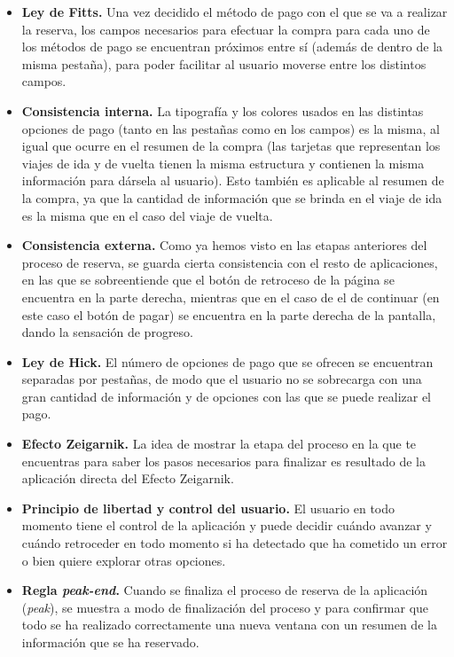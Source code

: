 \begin{itemize}
    \item \textbf{Ley de Fitts.} Una vez decidido el método de pago con el que se va a realizar la reserva, los campos
        necesarios para efectuar la compra para cada uno de los métodos de pago se encuentran próximos entre sí
        (además de dentro de la misma pestaña), para poder facilitar al usuario moverse entre los distintos campos.
    \item \textbf{Consistencia interna.} La tipografía y los colores usados en las distintas opciones de pago (tanto en las
        pestañas como en los campos) es la misma, al igual que ocurre en el resumen de la compra (las tarjetas que
        representan los viajes de ida y de vuelta tienen la misma estructura y contienen la misma información para
        dársela al usuario). Esto también es aplicable al resumen de la compra, ya que la cantidad de información
        que se brinda en el viaje de ida es la misma que en el caso del viaje de vuelta.
    \item \textbf{Consistencia externa.} Como ya hemos visto en las etapas anteriores del proceso de reserva, se
        guarda cierta consistencia con el resto de aplicaciones, en las que se sobreentiende que el botón de retroceso
        de la página se encuentra en la parte derecha, mientras que en el caso de el de continuar (en este caso el
        botón de pagar) se encuentra en la parte derecha de la pantalla, dando la sensación de progreso.
    \item \textbf{Ley de Hick.} El número de opciones de pago que se ofrecen se encuentran separadas por pestañas,
        de modo que el usuario no se sobrecarga con una gran cantidad de información y de opciones con las que se
        puede realizar el pago.
    \item \textbf{Efecto Zeigarnik.} La idea de mostrar la etapa del proceso en la que te encuentras para saber los
        pasos necesarios para finalizar es resultado de la aplicación directa del Efecto Zeigarnik.
    \item \textbf{Principio de libertad y control del usuario.} El usuario en todo momento tiene el control de la aplicación
        y puede decidir cuándo avanzar y cuándo retroceder en todo momento si ha detectado que ha cometido un error
        o bien quiere explorar otras opciones.
    \item \textbf{Regla \textit{peak-end}.} Cuando se finaliza el proceso de reserva de la aplicación (\textit{peak}), se muestra a modo
        de finalización del proceso y para confirmar que todo se ha realizado correctamente una nueva ventana con
        un resumen de la información que se ha reservado.
\end{itemize}

